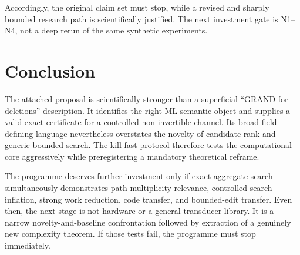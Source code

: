\documentclass[11pt]{article}
\begin{document}
Accordingly, the original claim set must stop, while a revised and sharply bounded research path is scientifically justified. The next investment gate is N1--N4, not a deep rerun of the same synthetic experiments.

\section{Conclusion}
The attached proposal is scientifically stronger than a superficial ``GRAND for deletions'' description. It identifies the right ML semantic object and supplies a valid exact certificate for a controlled non-invertible channel. Its broad field-defining language nevertheless overstates the novelty of candidate rank and generic bounded search. The kill-fast protocol therefore tests the computational core aggressively while preregistering a mandatory theoretical reframe.

The programme deserves further investment only if exact aggregate search simultaneously demonstrates path-multiplicity relevance, controlled search inflation, strong work reduction, code transfer, and bounded-edit transfer. Even then, the next stage is not hardware or a general transducer library. It is a narrow novelty-and-baseline confrontation followed by extraction of a genuinely new complexity theorem. If those tests fail, the programme must stop immediately.
\end{document}
